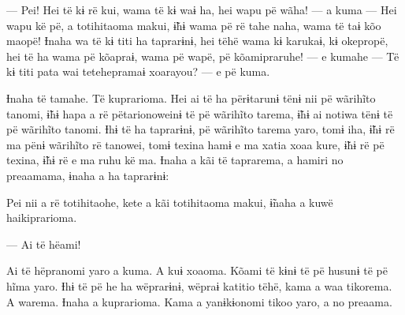 — Pei! Hei të kɨ rë kui, wama të kɨ waɨ ha, hei wapu pë wãha! --- a kuma
--- Hei wapu kë pë, a totihitaoma makui, ɨ̃hɨ wama pë rë tahe naha, wama
të taɨ kõo maopë! Ɨnaha wa të kɨ titi ha taprarɨnɨ, hei tëhë wama kɨ
karukaɨ, kɨ okepropë, hei të ha wama pë kõapraɨ, wama pë wapë, pë
kõamipraruhe! --- e kumahe --- Të kɨ titi pata wai tetehepramaɨ
xoarayou? --- e pë kuma. 

Ɨnaha të tamahe. Të kuprarioma. Hei ai të ha përɨtarunɨ tënɨ nii pë
wãrihĩto tanomi, ɨ̃hɨ hapa a rë pëtarionoweinɨ të pë wãrihĩto tarema, ɨ̃hɨ
ai notiwa tënɨ të pë wãrihĩto tanomi. Ɨhɨ të ha taprarɨnɨ, pë wãrihĩto
tarema yaro, tomɨ iha, ɨ̃hɨ rë ma pënɨ wãrihĩto rë tanowei, tomɨ texina
hamɨ e ma xatia xoaa kure, ɨ̃hɨ rë pë texina, ɨ̃hɨ rë e ma ruhu kë ma.
Ɨnaha a kãi të taprarema, a hamiri no preaamama, ɨnaha a ha taprarɨnɨ:

Pei nii a rë totihitaohe, kete a kãi totihitaoma makui, ɨ̃naha a kuwë
haikiprarioma. 

— Ai të hëami! 

Ai të hëpranomi yaro a kuma. A kuɨ xoaoma. Kõami të kɨnɨ të pë husunɨ të
pë hĩma yaro. Ɨhɨ të pë he ha wëprarɨnɨ, wëpraɨ katitio tëhë, kama a waa
tikorema. A warema. Ɨnaha a kuprarioma. Kama a yanɨkɨonomi tikoo yaro, a
no preaama.

 

